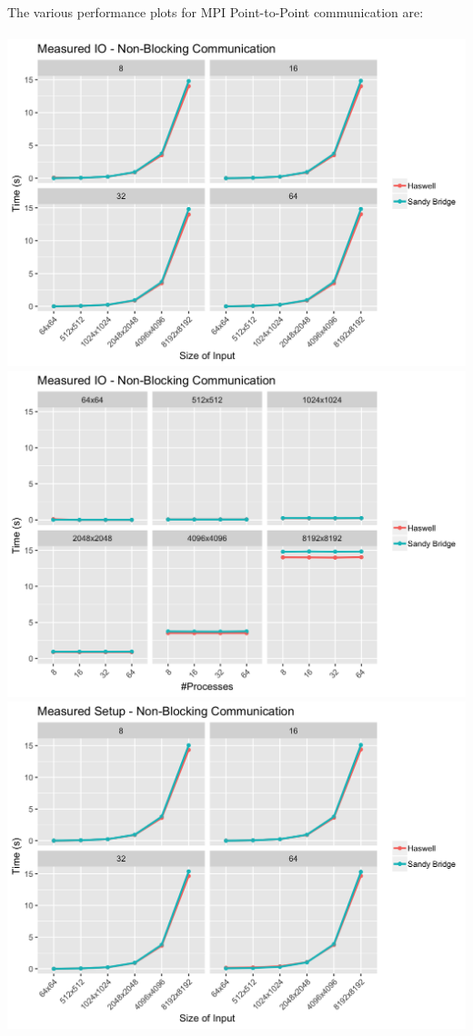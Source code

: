 \documentclass[10pt, letterpaper, twoside]{article}
\begin{document}
\begin{titlepage}
\begin{enumerate}
The various performance plots for MPI Point-to-Point communication are: \\
\\
\includegraphics[scale = 0.18]{P2P_Measured-IO_Processes.png}
\includegraphics[scale = 0.18]{P2P_Measured-IO_InputSize.png}
\vspace{2mm}
\includegraphics[scale = 0.18]{P2P_Measured-Setup_Processes.png}

\end{enumerate}
\end{titlepage}
\end{document}
